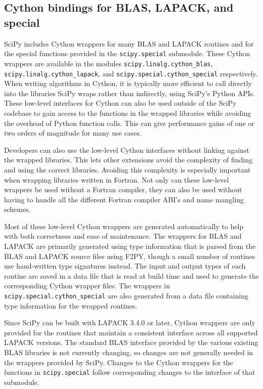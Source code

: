 \documentclass[fleqn,10pt]{wlscirep}
\begin{document}
\subsection*{Cython bindings for BLAS, LAPACK, and special}

SciPy includes Cython\cite{behnel2011cython} wrappers for many BLAS and LAPACK\cite{LAPACK} routines and for the special functions provided in the \texttt{scipy.{\allowbreak}special} submodule.
These Cython wrappers are available in the modules \texttt{scipy.{\allowbreak}linalg.{\allowbreak}cython\_blas}, \texttt{scipy.{\allowbreak}linalg.{\allowbreak}cython\_lapack}, and \texttt{scipy.{\allowbreak}special.{\allowbreak}cython\_special} respectively.
When writing algorithms in Cython, it is typically more efficient to call directly into the libraries SciPy wraps rather than indirectly, using SciPy's Python APIs.
These low-level interfaces for Cython can also be used outside of the SciPy codebase to gain access to the functions in the wrapped libraries while avoiding the overhead of Python function calls.
This can give performance gains of one or two orders of magnitude for many use cases.

Developers can also use the low-level Cython interfaces without linking against the wrapped libraries\cite{blas-lapack-wrappers-scipy-2015}.
This lets other extensions avoid the complexity of finding and using the correct libraries.
Avoiding this complexity is especially important when wrapping libraries written in Fortran.
Not only can these low-level wrappers be used without a Fortran compiler, they can also be used without having to handle all the different Fortran compiler ABI's and name mangling schemes.

Most of these low-level Cython wrappers are generated automatically to help with both correctness and ease of maintenance. 
The wrappers for BLAS and LAPACK are primarily generated using type information that is parsed from the BLAS and LAPACK source files using F2PY\cite{peterson2009f2py}, though a small number of routines use hand-written type signatures instead.
The input and output types of each routine are saved in a data file that is read at build time and used to generate the corresponding Cython wrapper files.
The wrappers in \texttt{scipy.{\allowbreak}special.{\allowbreak}cython\_special} are also generated from a data file containing type information for the wrapped routines.

Since SciPy can be built with LAPACK 3.4.0 or later, Cython wrappers are only provided for the routines that maintain a consistent interface across all supported LAPACK versions.
The standard BLAS interface provided by the various existing BLAS libraries is not currently changing, so changes are not generally needed in the wrappers provided by SciPy.
Changes to the Cython wrappers for the functions in \texttt{scipy.{\allowbreak}special} follow corresponding changes to the interface of that submodule.
\end{document}
